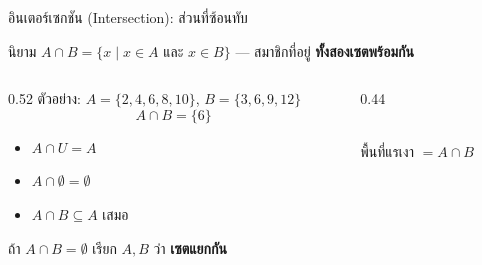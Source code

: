 \begin{frame}{อินเตอร์เซกชัน (Intersection): ส่วนที่ซ้อนทับ}
  \begin{block}{นิยาม}
    $A \cap B = \{x \mid x \in A \text{ และ } x \in B\}$ --- สมาชิกที่อยู่ \textbf{ทั้งสองเซตพร้อมกัน}
  \end{block}
  \begin{columns}[T]
    \begin{column}{0.52\textwidth}
      ตัวอย่าง: $A = \{2,4,6,8,10\}$, $B = \{3,6,9,12\}$
      \[ A \cap B = \{6\} \]
      \begin{itemize}\small
        \item $A \cap U = A$ 
        \item $A \cap \emptyset = \emptyset$ 
        \item $A \cap B \subseteq A$ เสมอ
      \end{itemize}
      \begin{alertblock}{}\small
        ถ้า $A \cap B = \emptyset$ เรียก $A, B$ ว่า \textbf{เซตแยกกัน} 
      \end{alertblock}
    \end{column}
    \begin{column}{0.44\textwidth}
      \begin{center}
      \\
      พื้นที่แรเงา $= A \cap B$
      \end{center}
    \end{column}
  \end{columns}
\end{frame}

